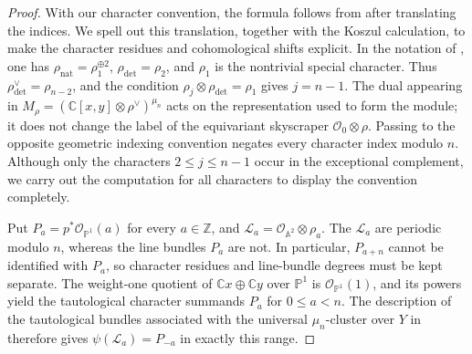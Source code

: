 \documentclass[11pt]{article}
\theoremstyle{plain}
\theoremstyle{definition}
\theoremstyle{remark}
\newcommand{\A}{\mathbb A}
\newcommand{\Pp}{\mathbb P}
\newcommand{\C}{\mathbb C}
\newcommand{\Z}{\mathbb Z}
\newcommand{\OO}{\mathcal O}
\begin{document}
\begin{proof}
With our character convention, the formula follows from
\cite[Example~3.5, equation~(26)]{GugiattiRota2023} after translating the
indices. We spell out this translation, together with the Koszul calculation,
to make the character residues and cohomological shifts explicit. In the
notation of \cite[Theorem~3.1]{GugiattiRota2023}, one has
\(\rho_{\mathrm{nat}}=\rho_1^{\oplus2}\),
\(\rho_{\det}=\rho_2\), and \(\rho_1\) is the nontrivial special character.
Thus \(\rho_{\det}^{\vee}=\rho_{n-2}\), and the condition
\(\rho_j\otimes\rho_{\det}=\rho_1\) gives \(j=n-1\). The dual appearing in
\(M_\rho=(\C[x,y]\otimes\rho^\vee)^{\mu_n}\) acts on the representation
used to form the module; it does not change the label of the equivariant
skyscraper \(\OO_0\otimes\rho\). Passing to the opposite geometric indexing
convention negates every character index modulo \(n\). Although only the
characters \(2\leq j\leq n-1\) occur in the exceptional complement, we carry
out the computation for all characters to display the convention completely.

Put \(P_a=p^*\OO_{\Pp^1}(a)\) for every \(a\in\Z\), and
\(\mathcal L_a=\OO_{\A^2}\otimes\rho_a\). The \(\mathcal L_a\) are
periodic modulo \(n\), whereas the line bundles \(P_a\) are not. In
particular, \(P_{a+n}\) cannot be identified with \(P_a\), so character
residues and line-bundle degrees must be kept separate. The weight-one
quotient of \(\C x\oplus\C y\) over \(\Pp^1\) is
\(\OO_{\Pp^1}(1)\), and its powers yield the tautological character
summands \(P_a\) for \(0\leq a<n\). The description of the tautological
bundles associated with the universal \(\mu_n\)-cluster over \(Y\) in
\cite[proof of Theorem~3.1, equations~(20)--(22)]{GugiattiRota2023} therefore
gives \(\psi(\mathcal L_a)=P_{-a}\) in exactly this range.


\end{proof}
\end{document}
